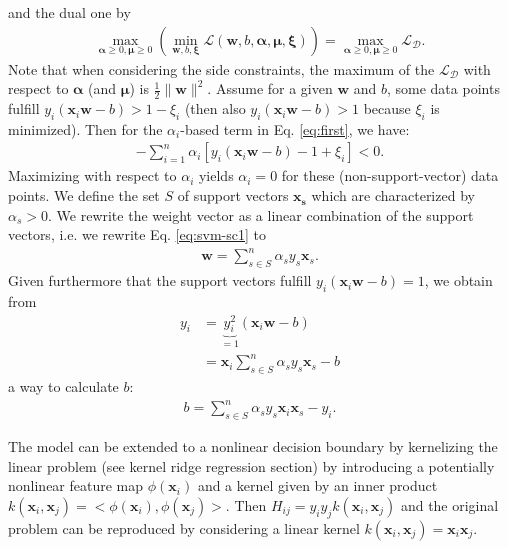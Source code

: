 \documentclass[11pt, a4paper, parskip=half*, bibliography=totoc, cleardoublepage=empty, final,
numbers=noenddot]{scrbook}
\begin{document}
and the dual one by
\begin{align}
\max_{\bm{\alpha}\geq0, \bm{\mu}\geq0}  \left(  \min_{\bm{w}, b, \bm{\xi}} \mathcal{L}(\bm{w}, b, \bm{\alpha}, \bm{\mu}, \bm{\xi}) \right) = \max_{\bm{\alpha}\geq0, \bm{\mu}\geq0}  \mathcal{L_\text{D}}.
\end{align}
Note that when considering the side constraints, the maximum of the $\mathcal{L_\text{D}}$ with respect to $\bm{\alpha}$ (and $\bm{\mu}$) is $\frac{1}{2} \|\bm{w} \|^2$. Assume for a given $\bm{w}$ and $b$, some data points fulfill $y_i(\bm{x}_i \bm{w} - b) > 1 -\xi_i$ (then also $y_i(\bm{x}_i \bm{w} - b) > 1$ because $\xi_i$ is minimized). Then for the $\alpha_i$-based term in Eq. \ref{eq:first}, we have:
\begin{align}
 - \sum_{i=1}^n \alpha_i[ y_i(\bm{x}_i \bm{w} - b) -1 + \xi_i]  <0.
\end{align}
Maximizing with respect to $\alpha_i$ yields $\alpha_i=0$ for these (non-support-vector) data points. 
We define the set $S$ of support vectors $\bm{x_s}$ which are characterized by $\alpha_s>0$. We rewrite the weight vector as a linear combination of the support vectors, i.e. we rewrite Eq. \ref{eq:svm-sc1} to 
\begin{align}
\bm{w} = \sum_{s \in S}^n \alpha_s y_s \bm{x}_s.
\end{align}
Given furthermore that the support vectors fulfill $y_i(\bm{x}_i \bm{w} - b) = 1$, we obtain from
\begin{align}
y_i &= \underbrace{y_i^2}_{=1}(\bm{x}_i \bm{w} - b) \\
& = \bm{x}_i \sum_{s \in S}^n \alpha_s y_s \bm{x}_s - b 
\end{align}
a way to calculate $b$:
\begin{align}
b =  \sum_{s \in S}^n \alpha_s y_s \bm{x}_i \bm{x}_s - y_i.
\end{align}

The model can be extended to a nonlinear decision boundary by kernelizing the linear problem (see kernel ridge regression section) by introducing a potentially nonlinear feature map $\phi(\bm{x}_i)$ and a kernel given by an inner product $k(\bm{x}_i ,\bm{x}_j) = <\phi(\bm{x}_i) , \phi(\bm{x}_j)>$. Then $H_{ij} = y_i y_j k(\bm{x}_i, \bm{x}_j)$ and the original problem can be reproduced by  considering a linear kernel $k(\bm{x}_i ,\bm{x}_j) = \bm{x}_i \bm{x}_j$. 
\end{document}
